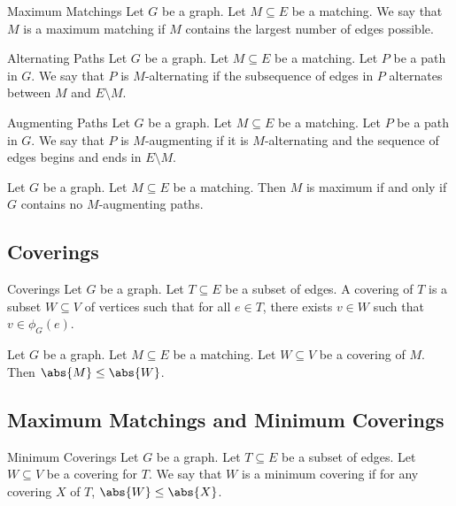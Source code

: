 \documentclass[a4paper]{article}
\begin{document}
\begin{defn}{Maximum Matchings}{} Let $G$ be a graph. Let $M\subseteq E$ be a matching. We say that $M$ is a maximum matching if $M$ contains the largest number of edges possible. 
\end{defn}

\begin{defn}{Alternating Paths}{} Let $G$ be a graph. Let $M\subseteq E$ be a matching. Let $P$ be a path in $G$. We say that $P$ is $M$-alternating if the subsequence of edges in $P$ alternates between $M$ and $E\setminus M$. 
\end{defn}

\begin{defn}{Augmenting Paths}{} Let $G$ be a graph. Let $M\subseteq E$ be a matching. Let $P$ be a path in $G$. We say that $P$ is $M$-augmenting if it is $M$-alternating and the sequence of edges begins and ends in $E\setminus M$. 
\end{defn}

\begin{prp}{}{} Let $G$ be a graph. Let $M\subseteq E$ be a matching. Then $M$ is maximum if and only if $G$ contains no $M$-augmenting paths. 
\end{prp}

\subsection{Coverings}
\begin{defn}{Coverings}{} Let $G$ be a graph. Let $T\subseteq E$ be a subset of edges. A covering of $T$ is a subset $W\subseteq V$ of vertices such that for all $e\in T$, there exists $v\in W$ such that $v\in\phi_G(e)$. 
\end{defn}

\begin{lmm}{}{} Let $G$ be a graph. Let $M\subseteq E$ be a matching. Let $W\subseteq V$ be a covering of $M$. Then $\abs{M}\leq\abs{W}$. 
\end{lmm}

\subsection{Maximum Matchings and Minimum Coverings}
\begin{defn}{Minimum Coverings}{} Let $G$ be a graph. Let $T\subseteq E$ be a subset of edges. Let $W\subseteq V$ be a covering for $T$. We say that $W$ is a minimum covering if for any covering $X$ of $T$, $\abs{W}\leq\abs{X}$. 
\end{defn}
\end{document}
